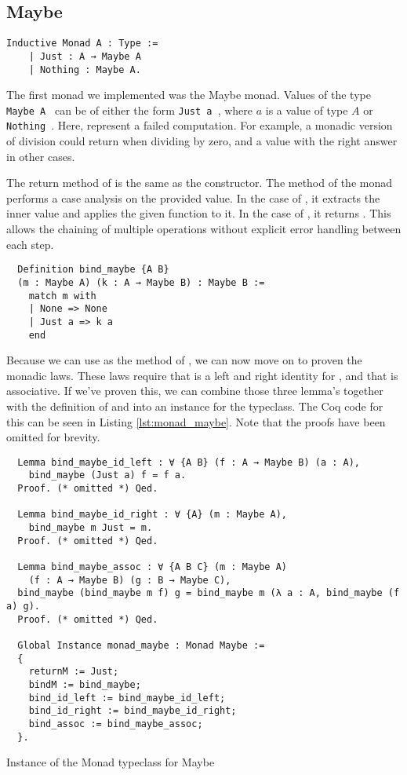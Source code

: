 \subsection{Maybe}
\begin{verbatim}
Inductive Monad A : Type :=
    | Just : A → Maybe A
    | Nothing : Maybe A.
\end{verbatim}

The first monad we implemented was the Maybe monad. Values of the type
\texttt{Maybe A } can be of either the form 
\texttt{Just a }, where $a$ is a value of type $A$ or 
\texttt{Nothing }. Here,  represent a failed
computation. For example, a monadic version of division  could return  when dividing by zero,
and a  value with the right answer in other cases.

The return method of  is the same as the  constructor. 
The  method of the  monad performs a case analysis on the provided
value. In the case of , it extracts the inner value and applies the given
function to it. In the case of , it returns . This allows the chaining
of multiple operations without explicit error handling between each step.

\begin{verbatim}
  Definition bind_maybe {A B} 
  (m : Maybe A) (k : A → Maybe B) : Maybe B :=
    match m with
    | None => None
    | Just a => k a
    end
\end{verbatim}

Because we can use  as the  method of , we
can now move on to proven the monadic laws. These laws require that
 is a left and right identity for , and that  is associative. If we've proven this, we can combine those three lemma's
together with the definition of  and  into an
instance for the  typeclass. The Coq code for this can be seen in
Listing \ref{lst:monad_maybe}. Note that the proofs have been omitted for
brevity.

\begin{listing}
\begin{verbatim}
  Lemma bind_maybe_id_left : ∀ {A B} (f : A → Maybe B) (a : A), 
    bind_maybe (Just a) f = f a.
  Proof. (* omitted *) Qed.

  Lemma bind_maybe_id_right : ∀ {A} (m : Maybe A), 
    bind_maybe m Just = m.
  Proof. (* omitted *) Qed.

  Lemma bind_maybe_assoc : ∀ {A B C} (m : Maybe A) 
    (f : A → Maybe B) (g : B → Maybe C),
  bind_maybe (bind_maybe m f) g = bind_maybe m (λ a : A, bind_maybe (f a) g).
  Proof. (* omitted *) Qed.

  Global Instance monad_maybe : Monad Maybe :=
  {
    returnM := Just;
    bindM := bind_maybe;
    bind_id_left := bind_maybe_id_left;
    bind_id_right := bind_maybe_id_right;
    bind_assoc := bind_maybe_assoc;
  }. 
\end{verbatim}
\caption{Instance of the Monad typeclass for Maybe}
\label{lst:monad_maybe}
\end{listing}

